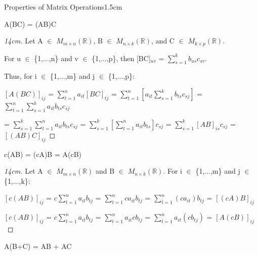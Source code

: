 \begin{ltheorem}{Properties of Matrix Operations}{1.5cm}
            \newpage
        
        \item A(BC) = (AB)C
        
            \begin{proof}[14cm]
                Let A $\in$ $M_{m \times n}(\mathbb{R})$,
                B $\in$ $M_{n \times k}(\mathbb{R})$,
                and C $\in$ $M_{k \times p}(\mathbb{R})$.

                For u $\in$ \{1,...,n\} and v $\in$ \{1,...,p\}, then
                [BC]$_{uv}$ = $\sum_{s=1}^k b_{us}c_{sv}$.

                Thus, for i $\in$ \{1,...,m\} and j $\in$ \{1,...,p\}:

                \hspace{0.2cm}
                $[A(BC)]_{ij}$ = $\sum_{t=1}^n a_{it}[BC]_{tj}$
                = $\sum_{t=1}^n [a_{it} \sum_{s=1}^k b_{ts}c_{sj}]$
                = $\sum_{t=1}^n \sum_{s=1}^k a_{it}b_{ts}c_{sj}$

                \hspace{0.2cm}
                = $\sum_{s=1}^k \sum_{t=1}^n a_{it}b_{ts}c_{sj}$
                = $\sum_{s=1}^k [\sum_{t=1}^n a_{it}b_{ts}]c_{sj}$
                = $\sum_{s=1}^k [AB]_{is} c_{sj}$
                = $[(AB)C]_{ij}$
            \end{proof}
        
        \item c(AB) = (cA)B = A(cB)
        
            \begin{proof}[14cm]
                Let A $\in$ $M_{m \times n}(\mathbb{R})$ and
                B $\in$ $M_{n \times k}(\mathbb{R})$.
                For i $\in$ \{1,...,m\} and j $\in$ \{1,...,k\}:

                \hspace{0.5cm}
                $[c(AB)]_{ij}$ = $c\sum_{t=1}^n a_{it}b_{tj}$
                = $\sum_{t=1}^n ca_{it}b_{tj}$
                = $\sum_{t=1}^n (ca_{it})b_{tj}$
                = $[(cA)B]_{ij}$

                \hspace{0.5cm}
                $[c(AB)]_{ij}$ = $c\sum_{t=1}^n a_{it}b_{tj}$
                = $\sum_{t=1}^n a_{it}cb_{tj}$
                = $\sum_{t=1}^n a_{it}(cb_{tj})$
                = $[A(cB)]_{ij}$
            \end{proof}

        \item A(B+C) = AB + AC
        

\end{ltheorem}
